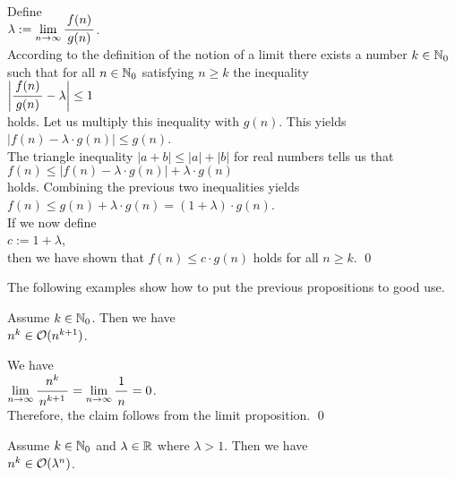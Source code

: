 \proof
Define \\[0.2cm]
\hspace*{1.3cm}
$\lambda := \lim\limits_{n \rightarrow \infty} \bruch{f(n)}{g(n)}$.  
\\[0.2cm]
According to the definition of the notion of a limit there exists a number $k \in {\mathbb N}_0$ such that
for all $n\in {\mathbb N}_0$ satisfying $n \geq k$ the inequality 
\\[0.2cm]
\hspace*{1.3cm}
$\left| \bruch{f(n)}{g(n)} - \lambda \right| \leq 1$ 
\\[0.2cm]
holds.  Let us multiply this inequality with $g(n)$.  This yields
\\[0.2cm]
\hspace*{1.3cm}
$|f(n) - \lambda \cdot g(n)| \leq g(n)$. 
\\[0.2cm]
The triangle inequality $|a + b| \leq |a| + |b|$ for real numbers tells us that 
\\[0.2cm]
\hspace*{1.3cm}
$f(n) \leq \bigl|f(n) - \lambda \cdot g(n)\bigr| + \lambda \cdot g(n)$ 
\\[0.2cm]
holds.  Combining the previous two inequalities yields
\\[0.2cm]
\hspace*{1.3cm}
$f(n) \leq g(n) + \lambda \cdot g(n) = (1 + \lambda) \cdot g(n)$. \\[0.2cm]
If we now define
\\[0.2cm]
\hspace*{1.3cm}
 $c := 1 +  \lambda$, 
\\[0.2cm] 
then we have shown that $f(n) \leq c \cdot g(n)$
holds for all $n \geq k$. \qed
\vspace*{0.3cm}

\noindent
The following examples show how to put the previous propositions to good use.

\example
Assume $k \in {\mathbb N}_0$.  Then we have
\\[0.2cm]
\hspace*{1.3cm}
 $n^k \in \mathcal{O}(n^{k+1})$.

\proof
We have \\[0.2cm]
\hspace*{1.3cm} 
$\lim\limits_{n \rightarrow \infty} \bruch{n^{k}}{n^{k+1}} = \lim\limits_{n \rightarrow   \infty} \bruch{1}{n} = 0$.
\\[0.2cm]
Therefore, the claim follows from the limit proposition. 
\qed


\example
Assume $k \in {\mathbb N}_0$ and $\lambda \in {\mathbb R}$ where $\lambda > 1$.  Then we have \\[0.2cm]
\hspace*{1.3cm} $n^k \in \mathcal{O}(\lambda^n)$.




